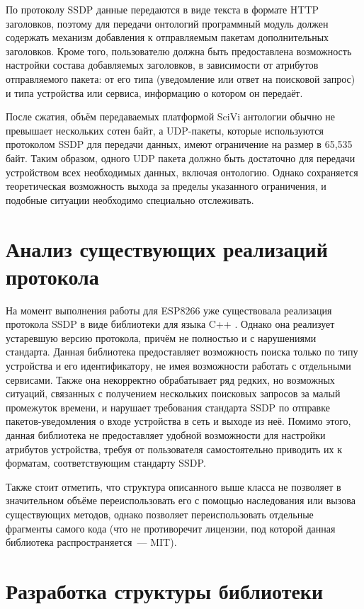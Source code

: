 По протоколу SSDP данные передаются в виде текста в формате HTTP заголовков, поэтому для передачи онтологий программный модуль должен содержать механизм добавления к отправляемым пакетам дополнительных заголовков.
Кроме того, пользователю должна быть предоставлена возможность настройки состава добавляемых заголовков, в зависимости от атрибутов отправляемого пакета: от его типа (уведомление или ответ на поисковой запрос) и типа устройства или сервиса, информацию о котором он передаёт.

После сжатия, объём передаваемых платформой SciVi антологии обычно не превышает нескольких сотен байт, а UDP-пакеты, которые используются протоколом SSDP для передачи данных, имеют ограничение на размер в 65,535 байт.
Таким образом, одного UDP пакета должно быть достаточно для передачи устройством всех необходимых данных, включая онтологию.
Однако сохраняется теоретическая возможность выхода за пределы указанного ограничения, и подобные ситуации необходимо специально отслеживать.

\section{Анализ существующих реализаций протокола}

На момент выполнения работы для ESP8266 уже существовала реализация протокола SSDP в виде библиотеки для языка C++ \cite{bib:library}.
Однако она реализует устаревшую версию протокола, причём не полностью и с нарушениями стандарта.
Данная библиотека предоставляет возможность поиска только по типу устройства и его идентификатору, не имея возможности работать с отдельными сервисами.
Также она некорректно обрабатывает ряд редких, но возможных ситуаций, связанных с получением нескольких поисковых запросов за малый промежуток времени, и нарушает требования стандарта SSDP по отправке пакетов-уведомления о входе устройства в сеть и выходе из неё.
Помимо этого, данная библиотека не предоставляет удобной возможности для настройки атрибутов устройства, требуя от пользователя самостоятельно приводить их к форматам, соответствующим стандарту SSDP.

Также стоит отметить, что структура описанного выше класса не позволяет в значительном объёме переиспользовать его с помощью наследования или вызова существующих методов, однако позволяет переиспользовать отдельные фрагменты самого кода (что не противоречит лицензии, под которой данная библиотека распространяется~--- MIT).

\section{Разработка структуры библиотеки}

